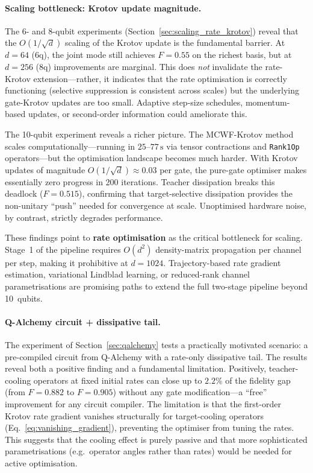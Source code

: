 \documentclass[11pt,a4paper]{article}
\begin{document}
\paragraph{Scaling bottleneck: Krotov update magnitude.}
The 6- and 8-qubit experiments (Section~\ref{sec:scaling_rate_krotov})
reveal that the $O(1/\sqrt{d})$ scaling of the Krotov update is the
fundamental barrier.  At $d = 64$ (6q), the joint mode still achieves
$F = 0.55$ on the richest basis, but at $d = 256$ (8q) improvements
are marginal.  This does \emph{not} invalidate the rate-Krotov
extension---rather, it indicates that the rate optimisation is correctly
functioning (selective suppression is consistent across scales) but the
underlying gate-Krotov updates are too small.  Adaptive step-size
schedules, momentum-based updates, or second-order information could
ameliorate this.

The 10-qubit experiment reveals a richer picture.  The MCWF-Krotov
method scales computationally---running in $25$--$77\,\text{s}$ via
tensor contractions and \texttt{Rank1Op} operators---but the
optimisation landscape becomes much harder.  With Krotov updates of
magnitude $O(1/\sqrt{d}) \approx 0.03$ per gate, the pure-gate
optimiser makes essentially zero progress in 200 iterations.
Teacher dissipation breaks this deadlock ($F = 0.515$), confirming
that target-selective dissipation provides the non-unitary ``push''
needed for convergence at scale.  Unoptimised hardware noise, by
contrast, strictly degrades performance.

These findings point to \textbf{rate optimisation} as the critical
bottleneck for scaling.  Stage~1 of the pipeline requires $O(d^2)$
density-matrix propagation per channel per step, making it prohibitive
at $d = 1024$.  Trajectory-based rate gradient estimation, variational
Lindblad learning, or reduced-rank channel parametrisations are
promising paths to extend the full two-stage pipeline beyond 10~qubits.

\paragraph{Q-Alchemy circuit + dissipative tail.}
The experiment of Section~\ref{sec:qalchemy} tests a practically
motivated scenario: a pre-compiled circuit from Q-Alchemy with a
rate-only dissipative tail.  The results reveal both a positive finding
and a fundamental limitation.  Positively, teacher-cooling operators at
fixed initial rates can close up to $2.2\%$ of the fidelity gap (from
$F = 0.882$ to $F = 0.905$) without any gate modification---a ``free''
improvement for any circuit compiler.  The limitation is that the
first-order Krotov rate gradient vanishes structurally for
target-cooling operators (Eq.~\ref{eq:vanishing_gradient}), preventing
the optimiser from tuning the rates.  This suggests that the cooling
effect is purely passive and that more sophisticated parametrisations
(e.g.\ operator angles rather than rates) would be needed for active
optimisation.
\end{document}
